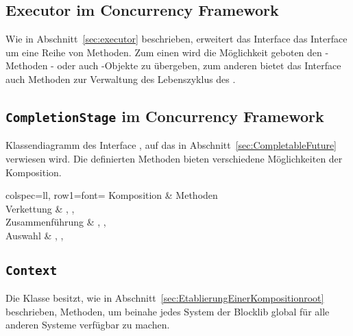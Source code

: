 \subsection{Executor im Concurrency Framework}\label{appendix:concFrameworkExecutor}


Wie in Abschnitt~\vref{sec:executor} beschrieben, erweitert das Interface \classExecutorService{} das Interface \classExecutor{} um eine Reihe von Methoden. Zum einen wird die Möglichkeit geboten den -Methoden \classRunnable{}- oder auch \classCallable{}-Objekte zu übergeben, zum anderen bietet das Interface auch Methoden zur Verwaltung des Lebenszyklus des \classExecutorService{}.

\clearpage
\subsection{\texttt{CompletionStage} im Concurrency Framework}\label{appendix:CompletionStage}


Klassendiagramm des Interface \classCompletionStage{}, auf das in Abschnitt~\vref{sec:CompletableFuture} verwiesen wird. Die definierten Methoden bieten verschiedene Möglichkeiten der Komposition.

\begin{tblr}{
	colspec={ll},
	row{1}={font=\bfseries}
	}
	Komposition & Methoden \\
	Verkettung & , , \\
	Zusammenführung & , ,  \\
	Auswahl & , ,  \\
\end{tblr}

\clearpage
\subsection{\texttt{Context}}\label{appendix:context}
{
	\centering
	
	\par
}
Die Klasse \classContext{} besitzt, wie in Abschnitt~\vref{sec:EtablierungEinerKompositionroot} beschrieben, Methoden, um beinahe jedes System der Blocklib global für alle anderen Systeme verfügbar zu machen. 

